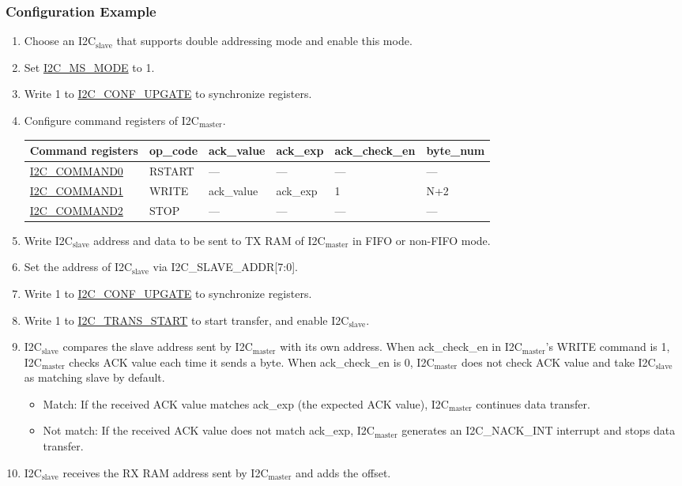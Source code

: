 \documentclass[main\_\_EN.tex]{subfiles}
\begin{document}
\subsubsection{Configuration Example}
\begin{enumerate}
\item Choose an I2C$_\text{slave}$ that supports double addressing mode and enable this mode.
\item Set \hyperref[fielddesc:I2CMSMODE]{I2C\_MS\_MODE} to 1.
\item Write 1 to \hyperref[fielddesc:I2CCONFUPGATE]{I2C\_CONF\_UPGATE} to synchronize registers.
\item Configure command registers of I2C$_\text{master}$.
\begin{longtable}{ | p{4cm} | p{2cm} | p{2cm} | p{2cm} |p{2cm} | p{2cm} |}
\hline\rowcolor{lightgray}
Command registers& op\_code & ack\_value&ack\_exp&ack\_check\_en&byte\_num  \\ \hline
\hyperref[fielddesc:I2CCOMMAND0]{I2C\_COMMAND0} & RSTART& ---&---&---&---  \\ \hline
\hyperref[fielddesc:I2CCOMMAND1]{I2C\_COMMAND1} & WRITE& ack\_value&ack\_exp&1&N+2  \\ \hline
\hyperref[fielddesc:I2CCOMMAND2]{I2C\_COMMAND2} & STOP& ---&---&---&---  \\ \hline
\end{longtable}
\item Write I2C$_\text{slave}$ address and data to be sent to TX RAM of I2C$_\text{master}$ in FIFO or non-FIFO mode.
\item Set the address of I2C$_\text{slave}$ via I2C\_SLAVE\_ADDR[7:0].
\item Write 1 to \hyperref[fielddesc:I2CCONFUPGATE]{I2C\_CONF\_UPGATE} to synchronize registers.
\item Write 1 to \hyperref[fielddesc:I2CTRANSSTART]{I2C\_TRANS\_START} to start transfer, and enable I2C$_\text{slave}$.
\item I2C$_\text{slave}$ compares the slave address sent by I2C$_\text{master}$ with its own address. When ack\_check\_en in I2C$_\text{master}$'s WRITE command is 1, I2C$_\text{master}$ checks ACK value each time it sends a byte. When ack\_check\_en is 0, I2C$_\text{master}$ does not check ACK value and take I2C$_\text{slave}$ as matching slave by default.
\begin{itemize}
\item Match: If the received ACK value matches ack\_exp (the expected ACK value), I2C$_\text{master}$ continues data transfer.
\item Not match: If the received ACK value does not match ack\_exp, I2C$_\text{master}$ generates an I2C\_NACK\_INT interrupt and stops data transfer.
\end{itemize}
\item I2C$_\text{slave}$ receives the RX RAM address sent by I2C$_\text{master}$ and adds the offset.


\end{enumerate}
\end{document}
